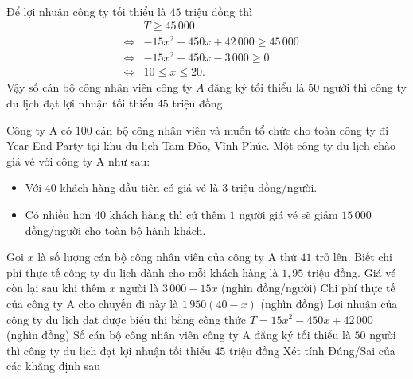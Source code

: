 \begin{ex}
{\begin{itemchoice}
\begin{eqnarray*}
	\end{eqnarray*}
	\itemch 
	Để lợi nhuận công ty tối thiểu là $45$ triệu đồng thì \begin{eqnarray*}
	&&T\ge  45\,000\\
	&\Leftrightarrow& -15x^2+450x+42\,000\ge45\,000\\ &\Leftrightarrow& -15x^2+450x-3\,000\ge0\\ &\Leftrightarrow& 10\le x  \le 20.
	\end{eqnarray*}
	Vậy số cán bộ công nhân viên công ty $A$ đăng ký tối thiểu là $50$ người  thì công ty du lịch đạt lợi nhuận tối thiểu $45$ triệu đồng.
	\end{itemchoice}
} 
\end{ex}

\begin{ex}%
	Công ty A có $100$ cán bộ công nhân viên và muốn tổ chức cho toàn công ty đi Year End Party tại khu du lịch Tam Đảo, Vĩnh Phúc. Một công ty du lịch chào giá vé với công ty A như sau: 
	\begin{itemize}
		\item Với 40 khách hàng đầu tiên có giá vé là $3$ triệu đồng/người. 
		\item Có nhiều hơn 40 khách hàng thì cứ thêm $1$  người giá vé sẽ giảm $15\,000$ đồng/người cho toàn bộ hành khách.
	\end{itemize}
	Gọi $x$ là số lượng cán bộ công nhân viên của công ty A thứ $41$  trở lên. Biết chi phí thực tế công ty du lịch dành cho mỗi khách hàng là $1{,}95$ triệu đồng.
	 \choiceTF
		{\True Giá vé còn lại sau  khi thêm $x$ người là $3\,000-15x$ (nghìn đồng/người)}
		{Chi  phí thực tế của công ty A cho chuyến đi này là $1\,950(40-x)$ (nghìn đồng)}
		{Lợi nhuận của công ty du lịch đạt được biểu  thị bằng công thức $T=15x^2-450x+42\,000$ (nghìn đồng)}
		{\True Số cán bộ công nhân viên công ty A đăng  ký tối thiểu là $50$ người thì công ty du lịch đạt lợi nhuận tối thiểu $45$ triệu đồng}
		Xét tính Đúng/Sai của  các khẳng định sau
\end{ex}
